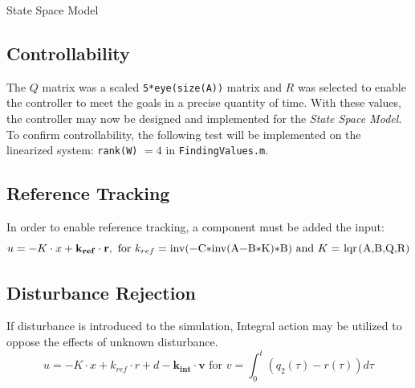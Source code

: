 \documentclass[12pt]{article}
\begin{document}
\begin{section}{State Space Model}
\subsection{Controllability}
The $Q$ matrix was a scaled \lstinline{5*eye(size(A))} matrix and $R$ was selected to enable the controller to meet the goals in a precise quantity of time.  With these values, the controller may now be designed and implemented for the \emph{State Space Model}.  To confirm controllability, the following test will be implemented on the linearized system: \lstinline{rank(W)} $= 4$ in \lstinline{FindingValues.m}.

\label{sec:2.3} \subsection{Reference Tracking}
In order to enable reference tracking, a component must be added the input:
\[ u = -K\cdot x + \mathbf{k_{ref}\cdot r}, \mbox{ for } k_{ref} = \lstinline{inv(-C*inv(A-B*K)*B)} \mbox{ and } K = \lstinline{lqr(A,B,Q,R)} \]

\subsection{Disturbance Rejection}
If disturbance is introduced to the simulation, Integral action may be utilized to oppose the effects of unknown disturbance.
\[ u = -K\cdot x + k_{ref}\cdot r + d - \mathbf{k_{int}\cdot v} \mbox{ for } v = \int_0^t (q_2(\tau) - r(\tau)) d\tau\]

\end{section}
\end{document}
